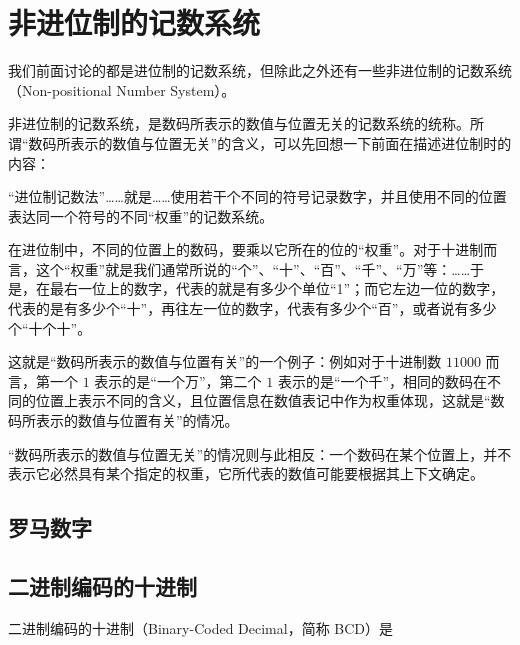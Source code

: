 \section{非进位制的记数系统}\label{sec:NumberSystemBasics/NonPositional}
    我们前面讨论的都是进位制的记数系统，但除此之外还有一些非进位制的记数系统（Non-positional Number System）。

    非进位制的记数系统，是数码所表示的数值与位置无关的记数系统的统称。所谓“数码所表示的数值与位置无关”的含义，可以先回想一下前面在描述进位制时的内容：

    \begin{displayquote}
        “进位制记数法”……就是……使用若干个不同的符号记录数字，并且使用不同的位置表达同一个符号的不同“权重”的记数系统。

        在进位制中，不同的位置上的数码，要乘以它所在的位的“权重”。对于十进制而言，这个“权重”就是我们通常所说的“个”、“十”、“百”、“千”、“万”等：……于是，在最右一位上的数字，代表的就是有多少个单位“1”；而它左边一位的数字，代表的是有多少个“十”，再往左一位的数字，代表有多少个“百”，或者说有多少个“十个十”。
    \end{displayquote}

    这就是“数码所表示的数值与位置有关”的一个例子：例如对于十进制数 $11000$ 而言，第一个 $1$ 表示的是“一个万”，第二个 $1$ 表示的是“一个千”，相同的数码在不同的位置上表示不同的含义，且位置信息在数值表记中作为权重体现，这就是“数码所表示的数值与位置有关”的情况。

    “数码所表示的数值与位置无关”的情况则与此相反：一个数码在某个位置上，并不表示它必然具有某个指定的权重，它所代表的数值可能要根据其上下文确定。

    \subsection{罗马数字}\label{subsec:NumberSystemBasics/NonPositional/RomanNumeral}

    \subsection{二进制编码的十进制}\label{subsec:NumberSystemBasics/NonPositional/BinaryCodedDecimal}
        二进制编码的十进制（Binary-Coded Decimal，简称 BCD）是
